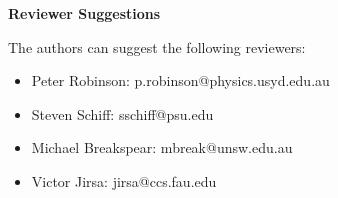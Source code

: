 \documentclass[]{article}
\begin{document}
	
\textbf{Reviewer Suggestions}

The authors can suggest the following reviewers:
\begin{itemize}
	\item Peter Robinson: p.robinson@physics.usyd.edu.au
	\item Steven Schiff: sschiff@psu.edu
	\item Michael Breakspear: mbreak@unsw.edu.au
	\item Victor Jirsa: jirsa@ccs.fau.edu
\end{itemize}
\end{document}
